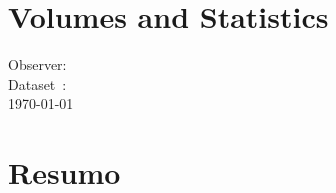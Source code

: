 \documentclass[11pt,a4paper,oneside]{article}
\begin{document}
\section*{Volumes and Statistics}


\pagebreak

\begin{flushleft}
Observer: \textbf{\Observer}\\
Dataset~: \textbf{\Dataset}\\
\today
\end{flushleft}


\section*{Resumo}
\end{document}
